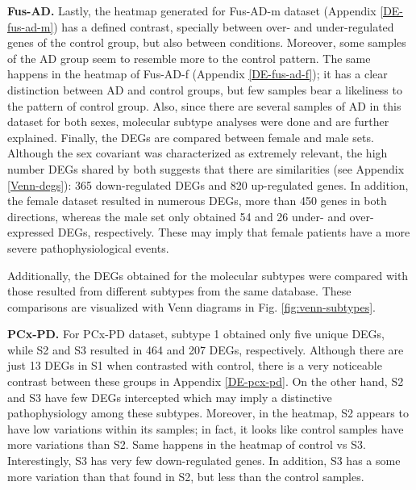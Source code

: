 \textbf{Fus-AD.} Lastly, the heatmap generated for Fus-AD-m dataset (Appendix \ref{DE-fus-ad-m}) has a defined contrast, specially between over- and under-regulated genes of the control group, but also between conditions. Moreover, some samples of the AD group seem to resemble more to the control pattern. The same happens in the heatmap of Fus-AD-f (Appendix \ref{DE-fus-ad-f}); it has a clear distinction between AD and control groups, but few samples bear a likeliness to the pattern of control group. Also, since there are several samples of AD in this dataset for both sexes, molecular subtype analyses were done and are further explained. Finally, the DEGs are compared between female and male sets. Although the sex covariant was characterized as extremely relevant, the high number DEGs shared by both suggests that there are similarities (see Appendix \ref{Venn-degs}): 365 down-regulated DEGs and 820 up-regulated genes. In addition, the female dataset resulted in numerous DEGs, more than 450 genes in both directions, whereas the male set only obtained 54 and 26 under- and over-expressed DEGs, respectively. These may imply that female patients have a more severe pathophysiological events.  

Additionally, the DEGs obtained for the molecular subtypes were compared with those resulted from different subtypes from the same database. These comparisons are visualized with Venn diagrams in Fig. \ref{fig:venn-subtypes}.

\textbf{PCx-PD.} For PCx-PD dataset, subtype 1 obtained only five unique DEGs, while S2 and S3 resulted in 464 and 207 DEGs, respectively. Although there are just 13 DEGs in S1 when contrasted with control, there is a very noticeable contrast between these groups in Appendix \ref{DE-pcx-pd}. On the other hand, S2 and S3 have few DEGs intercepted which may imply a distinctive pathophysiology among these subtypes. Moreover, in the heatmap, S2 appears to have low variations within its samples; in fact, it looks like control samples have more variations than S2. Same happens in the heatmap of control vs S3. Interestingly, S3 has very few down-regulated genes. In addition, S3 has a some more variation than that found in S2, but less than the control samples.

